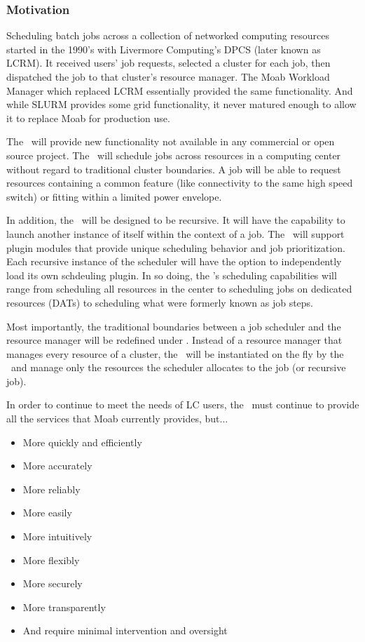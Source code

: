 \subsubsection{Motivation}

Scheduling batch jobs across a collection of networked computing
resources started in the 1990's with Livermore Computing's DPCS (later
known as LCRM).  It received users' job requests, selected a cluster
for each job, then dispatched the job to that cluster's resource
manager.  The Moab Workload Manager which replaced LCRM essentially
provided the same functionality.  And while SLURM provides some grid
functionality, it never matured enough to allow it to replace Moab for
production use.

The \ngjs\ will provide new functionality not available in any
commercial or open source project.  The \ngjs\ will schedule jobs
across resources in a computing center without regard to traditional
cluster boundaries.  A job will be able to request resources
containing a common feature (like connectivity to the same high speed
switch) or fitting within a limited power envelope.

In addition, the \ngjs\ will be designed to be recursive.  It will
have the capability to launch another instance of itself within the
context of a job.  The \ngjs\ will support plugin modules that provide
unique scheduling behavior and job prioritization.  Each recursive
instance of the scheduler will have the option to independently load
its own schdeuling plugin.  In so doing, the \ngjs's scheduling
capabilities will range from scheduling all resources in the center to
scheduling jobs on dedicated resources (DATs) to scheduling what were
formerly known as job steps.

Most importantly, the traditional boundaries between a job scheduler
and the resource manager will be redefined under \ngrm.  Instead of a
resource manager that manages every resource of a cluster, the
\ngrmfull\ will be instantiated on the fly by the \ngjs\ and manage
only the resources the scheduler allocates to the job (or recursive
job).

In order to continue to meet the needs of LC users, the \ngjs\ must
continue to provide all the services that Moab currently provides,
but...
\begin{itemize}
  \item More quickly and efficiently
  \item More accurately
  \item More reliably
  \item More easily
  \item More intuitively
  \item More flexibly
  \item More securely
  \item More transparently
  \item And require minimal intervention and oversight
\end{itemize}

